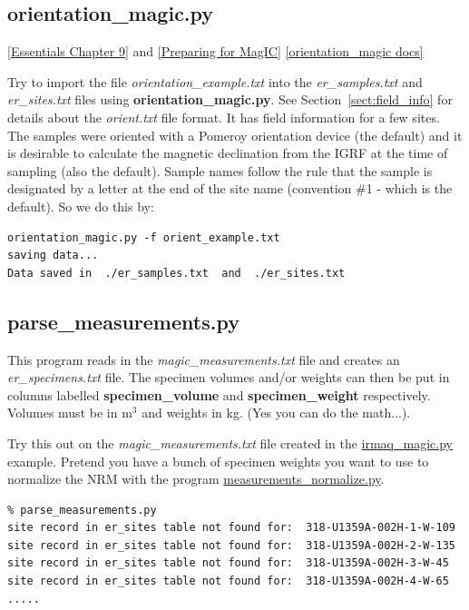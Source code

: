 \documentclass[11pt]{book}
\begin{document}
{{{ \subsection{orientation\_magic.py}
 \href{http://magician.ucsd.edu/Essentials_2/WebBook2ch9.html#ch9}{[Essentials Chapter 9]} and \href{#field_info}{[Preparing for MagIC]}
 \href{http://earthref.org/PmagPy/pmagpydocs/orientation_magic-module.html}{[orientation\_magic docs]}
 
     
  Try to import the file {\it orientation\_example.txt} into the {\it er\_samples.txt} and {\it er\_sites.txt} files using {\bf orientation\_magic.py}.  See Section~\ref{sect:field_info} for details about the {\it orient.txt} file format.  It has field information for a few sites.  The samples were oriented with a Pomeroy orientation device  (the default) and it is desirable to calculate the magnetic declination from the IGRF at the time of sampling (also the default).  Sample names follow the rule that the sample is designated by a letter at the end of the site name (convention \#1 - which is the default).  So we do this by:
  
  \begin{verbatim}
orientation_magic.py -f orient_example.txt 
saving data...
Data saved in  ./er_samples.txt  and  ./er_sites.txt

\end{verbatim}

%
\subsection{parse\_measurements.py}

This program reads in the {\it magic\_measurements.txt} file and creates an {\it er\_specimens.txt} file.   The specimen volumes and/or weights can then be put in columns labelled {\bf specimen\_volume} and {\bf specimen\_weight} respectively.  Volumes must be in m$^3$ and weights in kg.  (Yes you can do the math...).

Try this out on the {\it magic\_measurements.txt} file created in the \href{#irmaq_magic.py}{irmaq\_magic.py} example.  Pretend you have a bunch of specimen weights you want to use to normalize the NRM with the program \href{#measurements_normalize.py}{measurements\_normalize.py}.   

\begin{verbatim}
% parse_measurements.py
site record in er_sites table not found for:  318-U1359A-002H-1-W-109
site record in er_sites table not found for:  318-U1359A-002H-2-W-135
site record in er_sites table not found for:  318-U1359A-002H-3-W-45
site record in er_sites table not found for:  318-U1359A-002H-4-W-65
.....
\end{verbatim}

}}}
\end{document}
